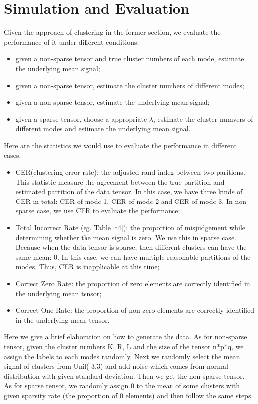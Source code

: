 \documentclass{article}
\begin{document}
\section{Simulation and Evaluation}
Given the approach of clustering in the former section, we evaluate the performance of it under different conditions: 
\begin{itemize}
	\item given a non-sparse tensor and true cluster numbers of each mode, estimate the underlying mean signal;
	\item given a non-sparse tensor, estimate the cluster numbers of different modes;
	\item given a non-sparse tensor, estimate the underlying mean signal;
	\item given a sparse tensor, choose a appropriate $\lambda$, estimate the cluster numvers of different modes and estimate the underlying mean signal.
\end{itemize}
Here are the statistics we would use to evaluate the performance in different cases:
\begin{itemize}
	\item CER(clustering error rate): the adjusted rand index between two paritions. This statistic measure the agreement between the true partition and estimated partition of the data tensor. In this case, we have three kinds of CER in total: CER of mode 1, CER of mode 2 and CER of mode 3. In non-sparse case, we use CER to evaluate the performance;
	\item Total Incorrect Rate (eg. Table \ref{t4}): the proportion of misjudgement while determining whether the mean signal is zero. We use this in sparse case. Because when the data tensor is sparse, then different clusters can have the same mean: 0. In this case, we can have multiple reasonable partitions of the modes. Thus, CER is inapplicable at this time;
	\item Correct Zero Rate: the proportion of zero elements are correctly identified in the underlying mean tensor;
	\item Correct One Rate: the proportion of non-zero elements are correctly identified in the underlying mean tensor.
\end{itemize}
Here we give a brief elaboration on how to generate the data. As for non-sparse tensor, given the cluster numbers K, R, L and the size of the tensor n*p*q, we assign the labels to each modes randomly. Next we randomly select the mean signal of clusters from Unif(-3,3) and add noise which comes from normal distribution with given standard deviation. Then we get the non-sparse tensor. As for sparse tensor, we randomly assign 0 to the mean of some  clusters with given sparsity rate (the proportion of 0 elements) and then follow the same steps.
\end{document}
